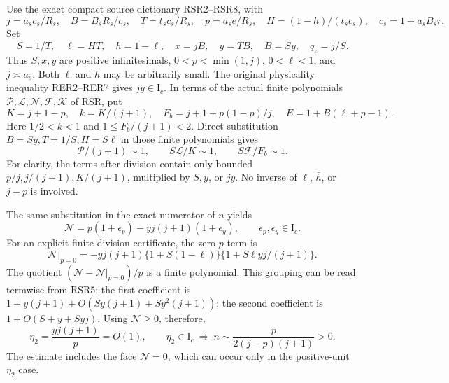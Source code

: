 Use the exact compact source dictionary RSR2--RSR8, with
\[
 j=a_sc_s/R_s,\quad B=B_sR_s/c_s,\quad T=t_sc_s/R_s,\quad
 p=a_se/R_s,\quad H=(1-h)/(t_sc_s),\quad c_s=1+a_sB_sr.
\]
Set
\[
 S=1/T,\quad \ell=HT,\quad \bar h=1-\ell,\quad
 x=jB,\quad y=TB,\quad B=Sy,\quad q_z=j/S .
                                                               \tag{RL2}
\]
Thus \(S,x,y\) are positive infinitesimals,
\(0<p<\min(1,j)\), \(0<\ell<1\), and \(j\asymp a_s\).
Both \(\ell\) and \(\bar h\) may be arbitrarily small.
The original physicality inequality RER2--RER7 gives \(jy\in\mathrm I_c\).
In terms of the actual finite polynomials \(\mathcal P,\mathcal L,
\mathcal N,\mathcal F,\mathcal K\) of RSR, put
\[
 K=j+1-p,\quad k=K/(j+1),\quad
 F_b=j+1+p(1-p)/j,\quad E=1+B(\ell+p-1).
                                                               \tag{RL3}
\]
Here \(1/2<k<1\) and \(1\le F_b/(j+1)<2\).  Direct substitution
\(B=Sy,T=1/S,H=S\ell\) in those finite polynomials gives
\[
 \mathcal P/(j+1)\sim1,\qquad
 S\mathcal L/K\sim1,\qquad S\mathcal F/F_b\sim1.         \tag{RL4}
\]
For clarity, the terms after division contain only bounded
\(p/j,j/(j+1),K/(j+1)\), multiplied by \(S,y\), or \(jy\).
No inverse of \(\ell\), \(\bar h\), or \(j-p\) is involved.

The same substitution in the exact numerator of \(n\) yields
\[
 \mathcal N=p(1+\epsilon_p)
                -yj(j+1)(1+\epsilon_y),\qquad
 \epsilon_p,\epsilon_y\in\mathrm I_c.                  \tag{RL5}
\]
For an explicit finite division certificate, the zero-\(p\) term is
\[
 \mathcal N|_{p=0}
 =-yj(j+1)\{1+S(1-\ell)\}
             \{1+S\ell yj/(j+1)\}.
\]
The quotient \((\mathcal N-\mathcal N|_{p=0})/p\) is a
finite polynomial.  This grouping can be read termwise from RSR5:
the first
coefficient is \(1+y(j+1)+O(Sy(j+1)+Sy^2(j+1))\);
the second coefficient is \(1+O(S+y+Syj)\).
Using \(\mathcal N\geq0\), therefore,
\[
 \eta_2=\frac{yj(j+1)}p=O(1),\qquad
 \eta_2\in\mathrm I_c\ \Longrightarrow\
 n\sim\frac{p}{2(j-p)(j+1)}>0 .                        \tag{RL6}
\]
The estimate includes the face \(\mathcal N=0\), which can occur
only in the positive-unit \(\eta_2\) case.

